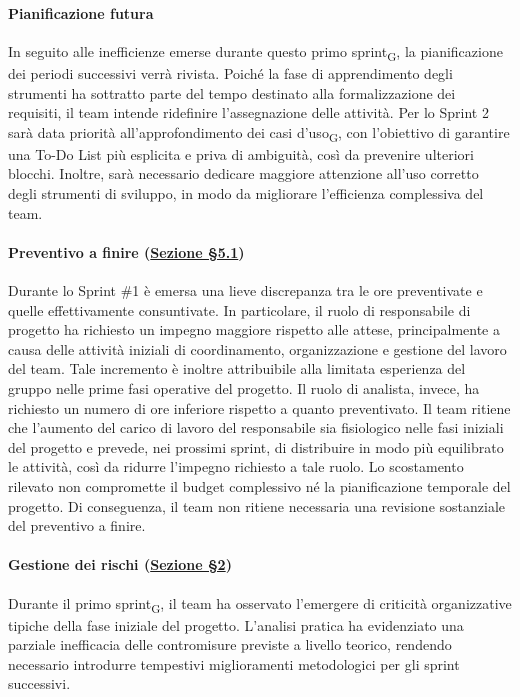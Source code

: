 \documentclass[a4paper, 10pt, colorlinks=true, linkcolor=black, urlcolor=blue, citecolor=blue, hidelinks]{article}
\begin{document}
\paragraph{Pianificazione futura}
In seguito alle inefficienze emerse durante questo primo sprint\textsubscript{G}, la pianificazione dei periodi successivi verrà rivista. Poiché la fase di apprendimento degli strumenti ha sottratto parte del tempo destinato alla formalizzazione dei requisiti, il team intende ridefinire l’assegnazione delle attività.
Per lo Sprint 2 sarà data priorità all'approfondimento dei casi d’uso\textsubscript{G}, con l’obiettivo di garantire una To-Do List più esplicita e priva di ambiguità, così da prevenire ulteriori blocchi. Inoltre, sarà necessario dedicare maggiore attenzione all’uso corretto degli strumenti di sviluppo, in modo da migliorare l’efficienza complessiva del team.
\paragraph{Preventivo a finire (\hyperref[tab:preventivo-finire]{Sezione \S5.1})}

Durante lo Sprint \#1 è emersa una lieve discrepanza
tra le ore preventivate e quelle effettivamente consuntivate.
In particolare, il ruolo di responsabile di progetto
ha richiesto un impegno maggiore rispetto alle attese,
principalmente a causa delle attività iniziali di coordinamento,
organizzazione e gestione del lavoro del team.
Tale incremento è inoltre attribuibile alla limitata esperienza
del gruppo nelle prime fasi operative del progetto.
Il ruolo di analista, invece, ha richiesto un numero di ore
inferiore rispetto a quanto preventivato.
Il team ritiene che l'aumento del carico di lavoro del responsabile
sia fisiologico nelle fasi iniziali del progetto e prevede,
nei prossimi sprint, di distribuire in modo più equilibrato
le attività, così da ridurre
l'impegno richiesto a tale ruolo.
Lo scostamento rilevato non compromette il budget complessivo
né la pianificazione temporale del progetto.
Di conseguenza, il team non ritiene necessaria
una revisione sostanziale del preventivo a finire.

\paragraph{Gestione dei rischi (\hyperref[tab:gestione-rischi]{Sezione \S2})}
Durante il primo sprint\textsubscript{G}, il team ha osservato l’emergere di criticità organizzative tipiche della fase iniziale del progetto. L’analisi pratica ha evidenziato una parziale inefficacia delle contromisure previste a livello teorico, rendendo necessario introdurre tempestivi miglioramenti metodologici per gli sprint successivi.
\end{document}
